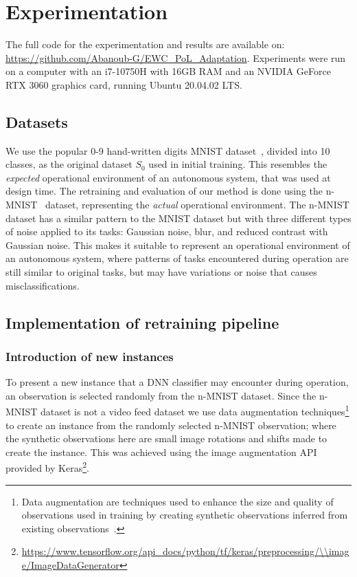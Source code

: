 \section{Experimentation}\label{sec:experimentation}
The full code for the experimentation and results are available on: \url{https://github.com/Abanoub-G/EWC_PoL_Adaptation}.
% 
Experiments were run on a computer with an i7-10750H with 16GB RAM and an NVIDIA GeForce RTX 3060 graphics card, running Ubuntu 20.04.02 LTS.
\subsection{Datasets}
We use the popular 0-9 hand-written digits MNIST dataset~\cite{deng2012mnist}, divided into 10 classes, as the original dataset $S_0$ used in initial training.
%
This resembles the \textit{expected} operational environment of an
autonomous system, that was used at design time.
%
The retraining and evaluation of our method is done using the n-MNIST~\cite{Basu2017} dataset, representing the \textit{actual} operational environment. 
%
The n-MNIST dataset has a similar pattern to the MNIST dataset but with three different types of noise applied to its tasks: Gaussian noise, blur, and reduced contrast with Gaussian noise. 
%
This makes it suitable to represent an operational environment of an autonomous system, where patterns of tasks encountered during operation are still similar to original tasks, but may have variations or noise that causes misclassifications.

\subsection{Implementation of retraining pipeline}
\subsubsection{Introduction of new instances}
To present a new instance that a DNN classifier may encounter during operation, an observation is selected randomly from the n-MNIST dataset.
%
Since the n-MNIST dataset is not a video feed dataset we use data augmentation techniques\footnote{Data augmentation are techniques used to enhance the size and quality of observations used in training by creating synthetic observations inferred from existing observations~\cite{Shorten2019}.} to create an instance from the randomly selected n-MNIST observation; where the synthetic observations here are small image rotations and shifts made to create the instance.
%
This was achieved using the image augmentation API provided by Keras\footnote{\url{https://www.tensorflow.org/api\_docs/python/tf/keras/preprocessing/\\image/ImageDataGenerator}}.  


